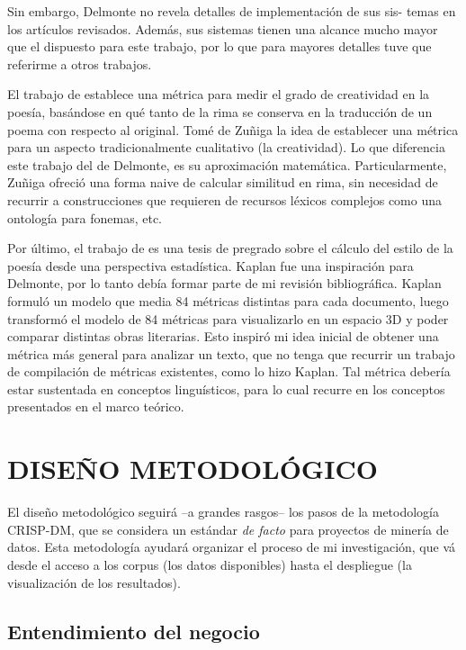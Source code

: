 \documentclass[twoside]{article}
\begin{document}
Sin embargo, Delmonte no revela detalles de implementación de sus sis-
temas en los artículos revisados. Además, sus sistemas tienen una
alcance mucho mayor que el dispuesto para este trabajo, por lo que para
mayores detalles tuve que referirme a otros trabajos.

El trabajo de \cite{zuniga2017automatic} establece una métrica para
medir el grado de creatividad en la poesía, basándose en qué tanto de
la rima se conserva en la traducción de un poema con respecto al
original. Tomé de Zuñiga la idea de establecer una métrica para un
aspecto tradicionalmente cualitativo (la creatividad). Lo que
diferencia este trabajo del de Delmonte, es su aproximación
matemática. Particularmente, Zuñiga ofreció una forma naive de
calcular similitud en rima, sin necesidad de recurrir a construcciones
que requieren de recursos léxicos complejos como una ontología para
fonemas, etc.

Por último, el trabajo de \cite{kaplan2006computational} es una tesis
de pregrado sobre el cálculo del estilo de la poesía desde una
perspectiva estadística. Kaplan fue una inspiración para Delmonte, por
lo tanto debía formar parte de mi revisión bibliográfica. Kaplan
formuló un modelo que media 84 métricas distintas para cada documento,
luego transformó el modelo de 84 métricas para visualizarlo en un
espacio 3D y poder comparar distintas obras literarias. Esto inspiró
mi idea inicial de obtener una métrica más general para analizar
un texto, que no tenga que recurrir un trabajo de compilación de métricas
existentes, como lo hizo Kaplan. Tal métrica debería estar sustentada
en conceptos linguísticos, para lo cual recurre en los conceptos
presentados en el marco teórico. 

\section{DISEÑO METODOLÓGICO}
\label{sec:org8c5706a}
El diseño metodológico seguirá --a grandes rasgos-- los pasos de la
metodología CRISP-DM, que se considera un estándar \emph{de facto} para
proyectos de minería de datos. Esta metodología ayudará organizar
el proceso de mi investigación, que vá desde el acceso a los
corpus (los datos disponibles) hasta el despliegue (la
visualización de los resultados).
\subsection{Entendimiento del negocio}
\label{sec:orgd7238cc}
\end{document}
